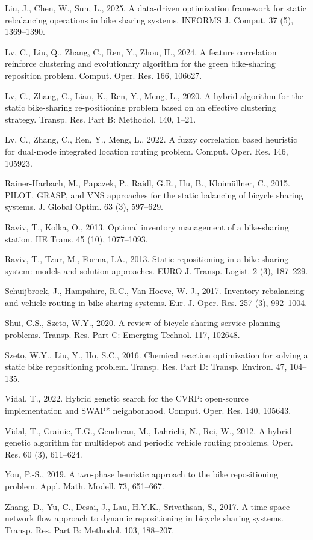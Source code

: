 \documentclass[11pt]{article}
\numberwithin{table}{section}
\numberwithin{figure}{section}
\begin{document}
Liu, J., Chen, W., Sun, L., 2025. A data-driven optimization framework for static rebalancing operations in bike sharing systems. INFORMS J. Comput. 37 (5), 1369–1390.\par
Lv, C., Liu, Q., Zhang, C., Ren, Y., Zhou, H., 2024. A feature correlation reinforce clustering and evolutionary algorithm for the green bike-sharing reposition problem. Comput. Oper. Res. 166, 106627.\par
Lv, C., Zhang, C., Lian, K., Ren, Y., Meng, L., 2020. A hybrid algorithm for the static bike-sharing re-positioning problem based on an effective clustering strategy. Transp. Res. Part B: Methodol. 140, 1–21.\par
Lv, C., Zhang, C., Ren, Y., Meng, L., 2022. A fuzzy correlation based heuristic for dual-mode integrated location routing problem. Comput. Oper. Res. 146, 105923.\par
Rainer-Harbach, M., Papazek, P., Raidl, G.R., Hu, B., Kloimüllner, C., 2015. PILOT, GRASP, and VNS approaches for the static balancing of bicycle sharing systems. J. Global Optim. 63 (3), 597–629.\par
Raviv, T., Kolka, O., 2013. Optimal inventory management of a bike-sharing station. IIE Trans. 45 (10), 1077–1093.\par
Raviv, T., Tzur, M., Forma, I.A., 2013. Static repositioning in a bike-sharing system: models and solution approaches. EURO J. Transp. Logist. 2 (3), 187–229.\par
Schuijbroek, J., Hampshire, R.C., Van Hoeve, W.-J., 2017. Inventory rebalancing and vehicle routing in bike sharing systems. Eur. J. Oper. Res. 257 (3), 992–1004.\par
Shui, C.S., Szeto, W.Y., 2020. A review of bicycle-sharing service planning problems. Transp. Res. Part C: Emerging Technol. 117, 102648.\par
Szeto, W.Y., Liu, Y., Ho, S.C., 2016. Chemical reaction optimization for solving a static bike repositioning problem. Transp. Res. Part D: Transp. Environ. 47, 104–135.\par
Vidal, T., 2022. Hybrid genetic search for the CVRP: open-source implementation and SWAP* neighborhood. Comput. Oper. Res. 140, 105643.\par
Vidal, T., Crainic, T.G., Gendreau, M., Lahrichi, N., Rei, W., 2012. A hybrid genetic algorithm for multidepot and periodic vehicle routing problems. Oper. Res. 60 (3), 611–624.\par
You, P.-S., 2019. A two-phase heuristic approach to the bike repositioning problem. Appl. Math. Modell. 73, 651–667.\par
Zhang, D., Yu, C., Desai, J., Lau, H.Y.K., Srivathsan, S., 2017. A time-space network flow approach to dynamic repositioning in bicycle sharing systems. Transp. Res. Part B: Methodol. 103, 188–207.\par
\endgroup
\end{document}
